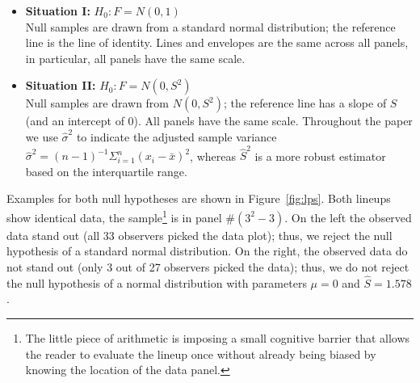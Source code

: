 \documentclass[12pt]{article}\usepackage[]{graphicx}\usepackage[]{color}
\newcommand{\alnote}[1]{\todo[inline,color=green!40]{#1}}
\newcommand{\hhnote}[1]{\todo[inline,color=magenta!40]{#1}}
\begin{document}
\begin{itemize}
\item{\bf Situation I:}
$H_0: F = N(0,1)$  \\
Null samples are drawn from a standard normal distribution; the reference line is the line of identity. Lines and envelopes are the same across all panels, in particular, all panels have the same scale. 
\item{\bf Situation II:} $H_0: F = N(0,S^2)$ \\
Null samples are drawn from $N(0, S^2)$; the reference line has a slope of $S$ (and an intercept of 0).  All panels have the same scale. Throughout the paper we use $\hat{\sigma}^2$ to indicate the adjusted sample variance $\hat{\sigma}^2 = (n-1)^{-1} \Sigma_{i=1}^n (x_i - \bar{x})^2$, whereas $\hat{S}^2$ is a more robust estimator based on the interquartile range.
\end{itemize}


Examples for both null hypotheses are shown in Figure~\ref{fig:lps}. Both lineups show identical data, the sample\footnote{The little piece of arithmetic is imposing a small cognitive barrier that allows the reader to evaluate the lineup once without already being biased by knowing the location of the data panel.} is in panel \#$(3^2-3)$. On the left the observed data stand out (all 33 observers picked the data plot); thus, we reject the null hypothesis of a standard normal distribution. On the right, the observed data do not stand out (only 3 out of 27 observers picked the data); thus, we do not reject the null hypothesis of a normal distribution with parameters $\mu=0$ and $\widehat{S}=1.578$. %
\end{document}
